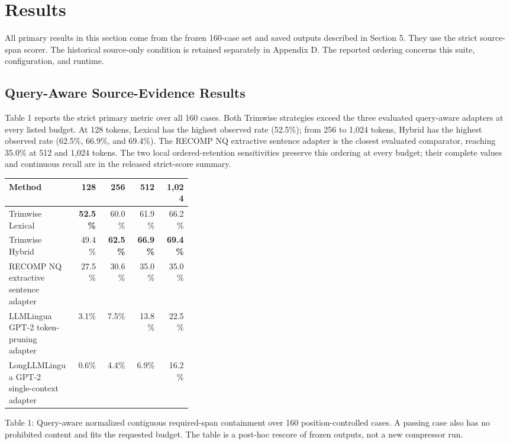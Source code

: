 \documentclass[
]{article}
\newcounter{none} %
\begin{document}
\section{Results}\label{results}

All primary results in this section come from the frozen 160-case set and
saved outputs described in Section 5. They use the strict source-span scorer.
The historical source-only condition is retained separately in Appendix D.
The reported ordering concerns this suite, configuration, and runtime.

\subsection{Query-Aware Source-Evidence
Results}\label{query-aware-source-evidence-results}

Table 1 reports the strict primary metric over all 160 cases. Both
Trimwise strategies exceed the three evaluated query-aware adapters at
every listed budget. At 128 tokens, Lexical has the highest observed
rate (52.5\%); from 256 to 1,024 tokens, Hybrid has the highest observed
rate (62.5\%, 66.9\%, and 69.4\%). The RECOMP NQ extractive sentence
adapter is the closest evaluated comparator, reaching 35.0\% at 512 and
1,024 tokens. The two local ordered-retention sensitivities preserve
this ordering at every budget; their complete values and continuous
recall are in the released strict-score summary.

{\def\LTcaptype{none} %
\begin{longtable}[]{@{}p{0.36\linewidth}rrrr@{}}
\toprule\noalign{}
Method
& 128 & 256 & 512 & 1,024 \\
\midrule\noalign{}
\endhead
\bottomrule\noalign{}
\endlastfoot
Trimwise Lexical & \textbf{52.5\%} & 60.0\% & 61.9\% & 66.2\% \\
Trimwise Hybrid & 49.4\% & \textbf{62.5\%} & \textbf{66.9\%} & \textbf{69.4\%} \\
RECOMP NQ extractive sentence adapter & 27.5\% & 30.6\% & 35.0\% & 35.0\% \\
LLMLingua GPT-2 token-pruning adapter & 3.1\% & 7.5\% & 13.8\% & 22.5\% \\
LongLLMLingua GPT-2 single-context adapter & 0.6\% & 4.4\% & 6.9\% & 16.2\% \\
\end{longtable}
}

Table 1: Query-aware normalized contiguous required-span containment over
160 position-controlled cases. A passing case also has no prohibited content
and fits the requested budget. The table is a post-hoc rescore of frozen
outputs, not a new compressor run.
\end{document}
